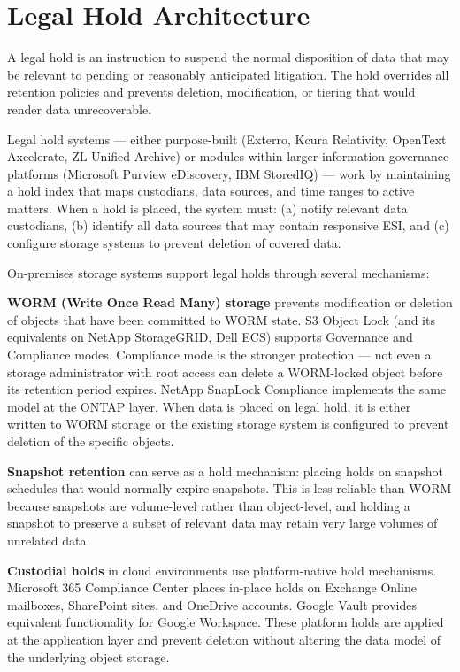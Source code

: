 \section{Legal Hold Architecture}
A legal hold is an instruction to suspend the normal disposition of data that may be relevant to pending or reasonably anticipated litigation. The hold overrides all retention policies and prevents deletion, modification, or tiering that would render data unrecoverable.

Legal hold systems --- either purpose-built (Exterro, Kcura Relativity, OpenText Axcelerate, ZL Unified Archive) or modules within larger information governance platforms (Microsoft Purview eDiscovery, IBM StoredIQ) --- work by maintaining a hold index that maps custodians, data sources, and time ranges to active matters. When a hold is placed, the system must: (a) notify relevant data custodians, (b) identify all data sources that may contain responsive ESI, and (c) configure storage systems to prevent deletion of covered data.

On-premises storage systems support legal holds through several mechanisms:

\textbf{WORM (Write Once Read Many) storage} prevents modification or deletion of objects that have been committed to WORM state. S3 Object Lock (and its equivalents on NetApp StorageGRID, Dell ECS) supports Governance and Compliance modes. Compliance mode is the stronger protection --- not even a storage administrator with root access can delete a WORM-locked object before its retention period expires. NetApp SnapLock Compliance implements the same model at the ONTAP layer. When data is placed on legal hold, it is either written to WORM storage or the existing storage system is configured to prevent deletion of the specific objects.

\textbf{Snapshot retention} can serve as a hold mechanism: placing holds on snapshot schedules that would normally expire snapshots. This is less reliable than WORM because snapshots are volume-level rather than object-level, and holding a snapshot to preserve a subset of relevant data may retain very large volumes of unrelated data.

\textbf{Custodial holds} in cloud environments use platform-native hold mechanisms. Microsoft 365 Compliance Center places in-place holds on Exchange Online mailboxes, SharePoint sites, and OneDrive accounts. Google Vault provides equivalent functionality for Google Workspace. These platform holds are applied at the application layer and prevent deletion without altering the data model of the underlying object storage.

